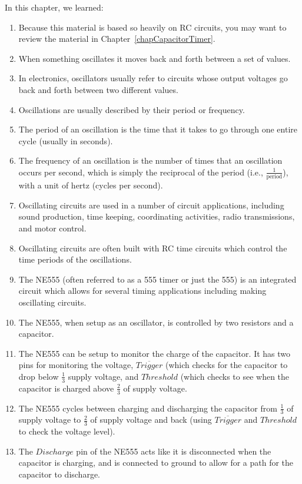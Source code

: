 In this chapter, we learned:

\begin{enumerate}
\item Because this material is based so heavily on RC circuits, you may want to review the material in Chapter~\ref{chapCapacitorTimer}.
\item When something oscillates it moves back and forth between a set of values.
\item In electronics, oscillators usually refer to circuits whose output voltages go back and forth between two different values.
\item Oscillations are usually described by their period or frequency.
\item The period of an oscillation is the time that it takes to go through one entire cycle (usually in seconds).
\item The frequency of an oscillation is the number of times that an oscillation occurs per second, which is simply the reciprocal of the period (i.e., $\frac{1}{\textrm{period}}$), with a unit of hertz (cycles per second).
\item Oscillating circuits are used in a number of circuit applications, including sound production, time keeping, coordinating activities, radio transmissions, and motor control.
\item Oscillating circuits are often built with RC time circuits which control the time periods of the oscillations.
\item The NE555 (often referred to as a 555 timer or just the 555) is an integrated circuit which allows for several timing applications including making oscillating circuits.
\item The NE555, when setup as an oscillator, is controlled by two resistors and a capacitor.
\item The NE555 can be setup to monitor the charge of the capacitor.  It has two pins for monitoring the voltage, $\overline{Trigger}$ (which checks for the capacitor to drop below $\frac{1}{3}$ supply voltage, and $Threshold$ (which checks to see when the capacitor is charged above $\frac{2}{3}$ of supply voltage.
\item The NE555 cycles between charging and discharging the capacitor from $\frac{1}{3}$ of supply voltage to $\frac{2}{3}$ of supply voltage and back (using $\overline{Trigger}$ and $Threshold$ to check the voltage level).
\item The $Discharge$ pin of the NE555 acts like it is disconnected when the capacitor is charging, and is connected to ground to allow for a path for the capacitor to discharge.

\end{enumerate}
